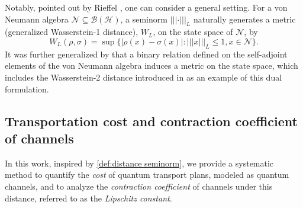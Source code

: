 \documentclass[11pt,reqno]{amsart}
\numberwithin{equation}{section}
\newcommand{\mc}{\mathcal}
\begin{document}
Notably, pointed out by Rieffel \cite{rieffel1999metrics,rieffel2004compact}, one can consider a general setting. For a von Neumann algebra $\mc N \subseteq \mc B(\mc H)$, a seminorm $|||\cdot|||_{L}$ naturally generates a metric (generalized Wasserstein-1 distance), $W_{L}$, on the state space of $\mc N$, by 
\begin{equation}\label{def:distance seminorm}
    W_{L}(\rho,\sigma) = \sup\{|\rho(x) - \sigma(x)|: |||x|||_{L} \le 1, x \in \mc N\}.
\end{equation}
It was further generalized by \cite{gaorouze24} that a binary relation defined on the self-adjoint elements of the von Neumann algebra induces a metric on the state space, which includes the Wasserstein-2 distance introduced in \cite{CM1,CM2,Wir2} as an example of this dual formulation. 
\fi

\subsection{Transportation cost and contraction coefficient of channels}
In this work, inspired by \eqref{def:distance seminorm}, we provide a systematic method to quantify the \textit{cost} of quantum transport plans, modeled as quantum channels, and to analyze the \textit{contraction coefficient} of channels under this distance, referred to as the \textit{Lipschitz constant}.
\end{document}
